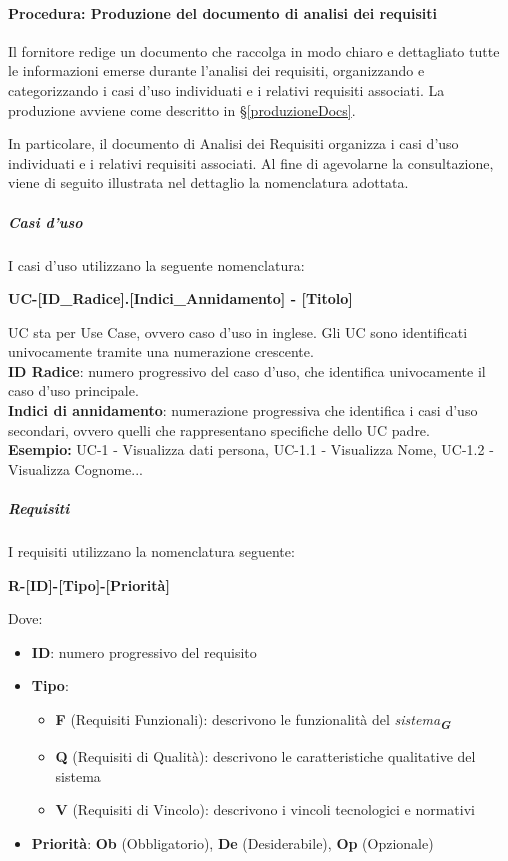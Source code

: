 \documentclass[a4paper,12pt]{article}
\newcommand{\glossario}[1]{\textit{#1}\textsubscript{\textbf{\textit{\textcolor{lightblack}{G}}}}}
\begin{document}
\paragraph{Procedura: Produzione del documento di analisi dei requisiti}
Il fornitore redige un documento che raccolga in modo chiaro e dettagliato
tutte le informazioni emerse durante l'analisi dei requisiti, organizzando e
categorizzando i casi d'uso individuati e i relativi requisiti associati. La
produzione avviene come descritto in §\ref{produzioneDocs}.

In particolare, il documento di Analisi dei Requisiti organizza i casi d'uso
individuati e i relativi requisiti associati. Al fine di agevolarne la
consultazione, viene di seguito illustrata nel dettaglio la nomenclatura
adottata.

\subparagraph{Casi d'uso}
I casi d'uso utilizzano la seguente nomenclatura:

\centerline{\textbf{UC-[ID\_Radice].[Indici\_Annidamento] - [Titolo]}}

UC sta per Use Case, ovvero caso d'uso in inglese. Gli UC sono identificati
univocamente tramite una numerazione crescente. \\ \textbf{ID Radice}: numero
progressivo del caso d'uso, che identifica univocamente il caso d'uso
principale. \\ \textbf{Indici di annidamento}: numerazione progressiva che
identifica i casi d'uso secondari, ovvero quelli che rappresentano specifiche
dello UC padre. \\ \textbf{Esempio:} UC-1 - Visualizza dati persona, UC-1.1 -
Visualizza Nome, UC-1.2 - Visualizza Cognome...
\subparagraph{Requisiti}
I requisiti utilizzano la nomenclatura seguente:

\centerline{\textbf{R-[ID]-[Tipo]-[Priorità]}}

Dove:
\begin{itemize}
    \item \textbf{ID}: numero progressivo del requisito
    \item \textbf{Tipo}:
          \begin{itemize}
              \item  \textbf{F} (Requisiti Funzionali): descrivono le funzionalità del \glossario{sistema}
              \item \textbf{Q} (Requisiti di Qualità): descrivono le caratteristiche qualitative del sistema
              \item \textbf{V} (Requisiti di Vincolo): descrivono i vincoli tecnologici e normativi
          \end{itemize}
    \item \textbf{Priorità}: \textbf{Ob} (Obbligatorio), \textbf{De} (Desiderabile), \textbf{Op} (Opzionale)
\end{itemize}
\end{document}
